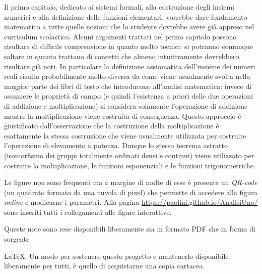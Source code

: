 Il primo capitolo, dedicato ai sistemi formali, alla costruzione %
degli insiemi numerici e alla definizione delle funzioni elementari, %
vorrebbe dare fondamento matematico a tutte quelle nozioni che %
lo studente dovrebbe avere già appreso nel curriculum scolastico. %
Alcuni argomenti trattati nel primo capitolo possono risultare %
di difficile comprensione in quanto molto tecnici: %
si potranno comunque saltare in quanto trattano di concetti %
che almeno intuitivamente dovrebbero risultare già noti. %
In particolare la definizione assiomatica dell'insieme %
dei numeri reali risulta probabilmente molto diversa da %
come viene usualmente svolta nella maggior parte dei libri di testo %
che introducono all'analisi matematica: %
invece di assumere le proprietà di campo (e quindi l'esistenza %
a priori delle due operazioni di addizione e moltiplicazione) %
si considera solamente l'operazione di addizione %
mentre la moltiplicazione viene costruita di conseguenza. %
Questo approccio è giustificato dall'osservazione che %
la costruzione della moltiplicazione è esattamente la stessa %
costruzione che viene usualmente utilizzata per costruire %
l'operazione di elevamento a potenza. %
Dunque lo stesso teorema astratto %
(isomorfismo dei gruppi totalmente ordinati densi e continui) %
viene utilizzato per costruire la moltiplicazione, %
le funzioni esponenziali e le funzioni trigonometriche. %

Le figure non sono frequenti ma a margine di molte di esse  %
è presente un \emph{QR-code} (un quadrato formato da una nuvola di pixel) %
che permette di accedere alla figura  %
\emph{online} e modicarne i parametri.  %
Alla pagina \url{https://paolini.github.io/AnalisiUno/} 
sono inseriti tutti i collegamenti alle figure interattive.
\begin{comment}
Di seguito in questa pagina trovate l'elenco %
con i collegamenti alle figure interattive. %
\end{comment}
Queste note sono rese disponibili liberamente sia in formato PDF che %
in forma di sorgente %
\begin{comment}
LaTeX. %
\end{comment}
\LaTeX{}.
Un modo per sostenere questo progetto e mantenerlo disponibile liberamente 
per tutti, è quello di acquistarne una copia cartacea.

